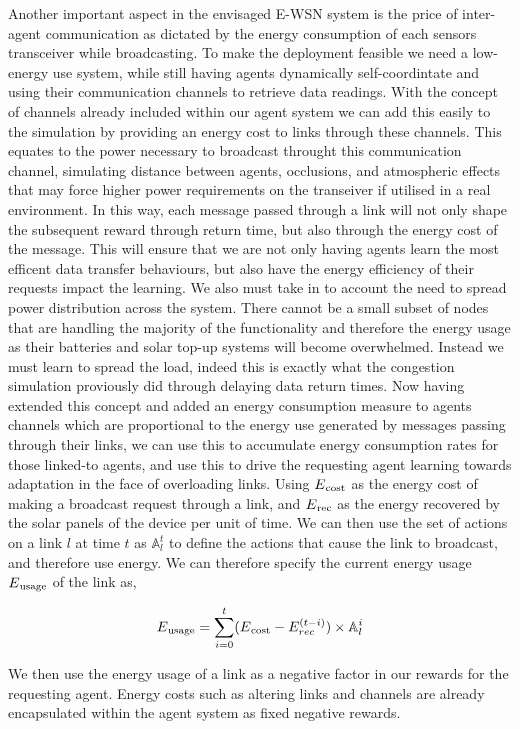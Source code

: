 Another important aspect in the envisaged E-WSN system is the price of inter-agent communication as dictated by the energy consumption of each sensors transceiver while broadcasting. To make the deployment feasible we need a low-energy use system, while still having agents dynamically self-coordintate and using their communication channels to retrieve data readings. With the concept of channels already included within our agent system we can add this easily to the simulation by providing an energy cost to links through these channels. This equates to the power necessary to broadcast throught this communication channel, simulating distance between agents, occlusions, and atmospheric effects that may force higher power requirements on the transeiver if utilised in a real environment. In this way, each message passed through a link will not only shape the subsequent reward through return time, but also through the energy cost of the message. This will ensure that we are not only having agents learn the most efficent data transfer behaviours, but also have the energy efficiency of their requests impact the learning. We also must take in to account the need to spread power distribution across the system. There cannot be a small subset of nodes that are handling the majority of the functionality and therefore the energy usage as their batteries and solar top-up systems will become overwhelmed. Instead we must learn to spread the load, indeed this is exactly what the congestion simulation proviously did through delaying data return times.
\newline
\newline
Now having extended this concept and added an energy consumption measure to agents channels which are proportional to the energy use generated by messages passing through their links, we can use this to accumulate energy consumption rates for those linked-to agents, and use this to drive the requesting agent learning towards adaptation in the face of overloading links. Using $E\textsubscript{cost} $ as the energy cost of making a broadcast request through a link, and $E\textsubscript{rec}$ as the energy recovered by the solar panels of the device per unit of time. We can then use the set of actions on a link $l$ at time $t$ as  $\mathbb{A}_l^t$ to define the actions that cause the link to broadcast, and therefore use energy. We can therefore specify the current energy usage $E\textsubscript{usage} $ of the link as,

\begin{equation}
	E\textsubscript{usage} =  \sum\limits_{i=0}^{t}
	(E\textsubscript{cost} - E_{rec}^{(t-i)})
	\times \mathbb{A}_l^i
\end{equation}
\newline
\newline

We then use the energy usage of a link as a negative factor in our rewards for the requesting agent. Energy costs such as altering links and channels are already encapsulated within the agent system as fixed negative rewards.